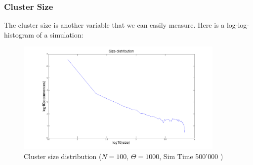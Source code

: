 \documentclass[11pt]{article}
\begin{document}
\subsubsection{Cluster Size}
The cluster size is another variable that we can easily measure. Here is a log-log-histogram of a simulation:
\begin{figure}[H]
\includegraphics[width=0.9\textwidth,keepaspectratio=true]{Pictures/Size_dist_1.png}
\caption{Cluster size distribution ($N=100$, $\Theta= 1000 $, Sim Time 500'000  ) }
\end{figure}

\end{document}
